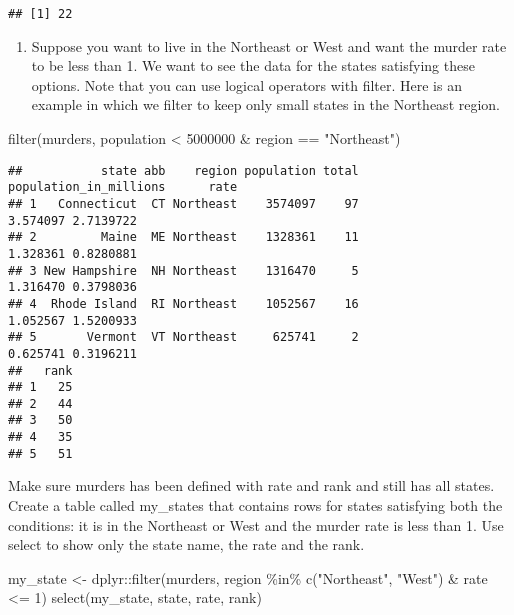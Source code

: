 \documentclass[
]{article}
\newenvironment{Shaded}{\begin{snugshade}}{\end{snugshade}}
\newcommand{\DecValTok}[1]{\textcolor[rgb]{0.00,0.00,0.81}{#1}}
\newcommand{\FunctionTok}[1]{\textcolor[rgb]{0.00,0.00,0.00}{#1}}
\newcommand{\NormalTok}[1]{#1}
\newcommand{\OtherTok}[1]{\textcolor[rgb]{0.56,0.35,0.01}{#1}}
\newcommand{\SpecialCharTok}[1]{\textcolor[rgb]{0.00,0.00,0.00}{#1}}
\newcommand{\StringTok}[1]{\textcolor[rgb]{0.31,0.60,0.02}{#1}}
\providecommand{\tightlist}{%
  \setlength{\itemsep}{0pt}\setlength{\parskip}{0pt}}
\begin{document}
\begin{verbatim}
## [1] 22
\end{verbatim}

\begin{enumerate}
\def\labelenumi{\arabic{enumi}.}
\setcounter{enumi}{6}
\tightlist
\item
  Suppose you want to live in the Northeast or West and want the murder
  rate to be less than 1. We want to see the data for the states
  satisfying these options. Note that you can use logical operators with
  filter. Here is an example in which we filter to keep only small
  states in the Northeast region.
\end{enumerate}

\begin{Shaded}
\begin{Highlighting}[]
\FunctionTok{filter}\NormalTok{(murders, population }\SpecialCharTok{\textless{}} \DecValTok{5000000} \SpecialCharTok{\&}\NormalTok{ region }\SpecialCharTok{==} \StringTok{"Northeast"}\NormalTok{)}
\end{Highlighting}
\end{Shaded}

\begin{verbatim}
##           state abb    region population total population_in_millions      rate
## 1   Connecticut  CT Northeast    3574097    97               3.574097 2.7139722
## 2         Maine  ME Northeast    1328361    11               1.328361 0.8280881
## 3 New Hampshire  NH Northeast    1316470     5               1.316470 0.3798036
## 4  Rhode Island  RI Northeast    1052567    16               1.052567 1.5200933
## 5       Vermont  VT Northeast     625741     2               0.625741 0.3196211
##   rank
## 1   25
## 2   44
## 3   50
## 4   35
## 5   51
\end{verbatim}

Make sure murders has been defined with rate and rank and still has all
states. Create a table called my\_states that contains rows for states
satisfying both the conditions: it is in the Northeast or West and the
murder rate is less than 1. Use select to show only the state name, the
rate and the rank.

\begin{Shaded}
\begin{Highlighting}[]
\NormalTok{my\_state }\OtherTok{\textless{}{-}}\NormalTok{ dplyr}\SpecialCharTok{::}\FunctionTok{filter}\NormalTok{(murders, region }\SpecialCharTok{\%in\%} \FunctionTok{c}\NormalTok{(}\StringTok{"Northeast"}\NormalTok{, }\StringTok{"West"}\NormalTok{) }\SpecialCharTok{\&}\NormalTok{ rate }\SpecialCharTok{\textless{}=} \DecValTok{1}\NormalTok{)}
\FunctionTok{select}\NormalTok{(my\_state, state, rate, rank)}
\end{Highlighting}
\end{Shaded}
\end{document}
